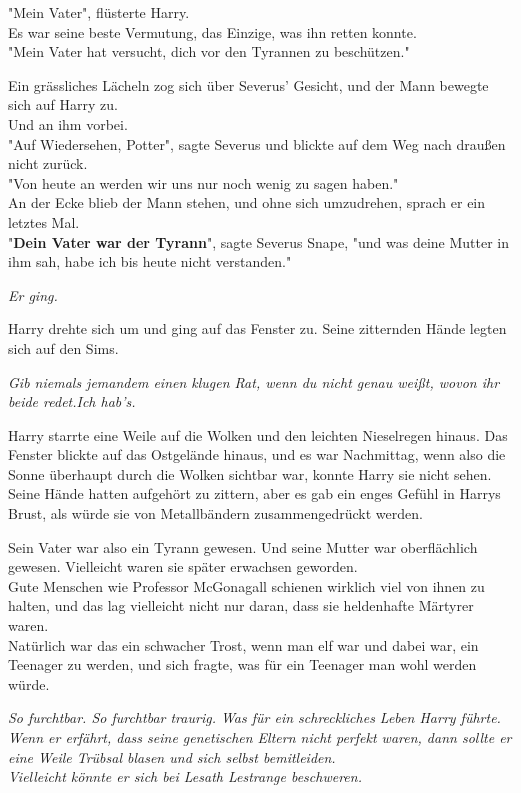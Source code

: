 {"Mein Vater", flüsterte Harry.\\ Es war seine beste Vermutung, das Einzige, was ihn retten konnte.\\ "Mein Vater hat versucht, dich vor den Tyrannen zu beschützen."

Ein grässliches Lächeln zog sich über Severus' Gesicht, und der Mann bewegte sich auf Harry zu.\\ Und an ihm vorbei.\\ "Auf Wiedersehen, Potter", sagte Severus und blickte auf dem Weg nach draußen nicht zurück.\\ "Von heute an werden wir uns nur noch wenig zu sagen haben."\\ An der Ecke blieb der Mann stehen, und ohne sich umzudrehen, sprach er ein letztes Mal.\\ "\textbf{Dein Vater war der Tyrann}", sagte Severus Snape, "und was deine Mutter in ihm sah, habe ich bis heute nicht verstanden."

\emph{Er ging.}

Harry drehte sich um und ging auf das Fenster zu. Seine zitternden Hände legten sich auf den Sims.

\emph{Gib niemals jemandem einen klugen Rat, wenn du nicht genau weißt, wovon ihr} \emph{beide redet.Ich hab's.}

Harry starrte eine Weile auf die Wolken und den leichten Nieselregen hinaus. Das Fenster blickte auf das Ostgelände hinaus, und es war Nachmittag, wenn also die Sonne überhaupt durch die Wolken sichtbar war, konnte Harry sie nicht sehen.\\ Seine Hände hatten aufgehört zu zittern, aber es gab ein enges Gefühl in Harrys Brust, als würde sie von Metallbändern zusammengedrückt werden.

Sein Vater war also ein Tyrann gewesen. Und seine Mutter war oberflächlich gewesen. Vielleicht waren sie später erwachsen geworden.\\ Gute Menschen wie Professor McGonagall schienen wirklich viel von ihnen zu halten, und das lag vielleicht nicht nur daran, dass sie heldenhafte Märtyrer waren.\\ Natürlich war das ein schwacher Trost, wenn man elf war und dabei war, ein Teenager zu werden, und sich fragte, was für ein Teenager man wohl werden würde.

\emph{So furchtbar. So furchtbar traurig. Was für ein schreckliches Leben Harry führte. Wenn er erfährt, dass seine genetischen Eltern nicht perfekt waren, dann sollte er eine Weile Trübsal blasen und sich selbst bemitleiden.\\ Vielleicht könnte er sich bei Lesath Lestrange beschweren.}

}
